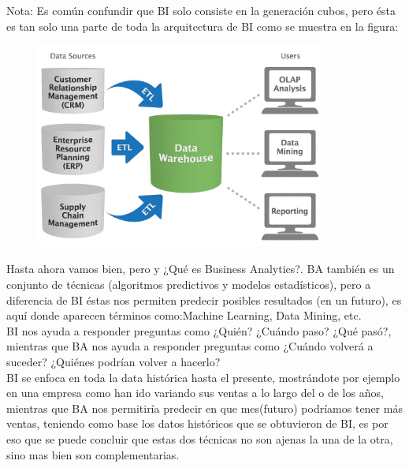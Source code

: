 \documentclass[preprint,12pt]{elsarticle}
\begin{document}
	Nota: Es común confundir que BI solo consiste en la generación cubos, pero ésta es tan solo una parte de toda la arquitectura de BI como se muestra en la figura:
	\begin{figure}[htb]
		\begin{center}
			\includegraphics[width=9.5cm]{./Imagenes/img3}
		\end{center}
	\end{figure}
	
	Hasta ahora vamos bien, pero y ¿Qué es Business Analytics?. BA también es un conjunto de técnicas (algoritmos predictivos y modelos estadísticos), pero a diferencia de BI éstas nos permiten predecir posibles resultados (en un futuro), es aquí donde aparecen términos como:Machine Learning, Data Mining, etc.\\
	
	BI nos ayuda a responder preguntas como ¿Quién? ¿Cuándo paso? ¿Qué pasó?, mientras que BA nos ayuda a responder preguntas como ¿Cuándo volverá a suceder?  ¿Quiénes podrían volver a hacerlo?\\
	
	BI se enfoca en toda la data histórica hasta el presente, mostrándote por ejemplo en una empresa como han ido variando sus ventas a lo largo del o de los años, mientras que BA nos permitiría predecir en que mes(futuro) podríamos tener más ventas, teniendo como base los datos históricos que se obtuvieron de BI, es por eso que se puede concluir que estas dos técnicas no son ajenas la una de la otra, sino mas bien son complementarias.\cite{bib01:BI:Online}
		
\end{document}
